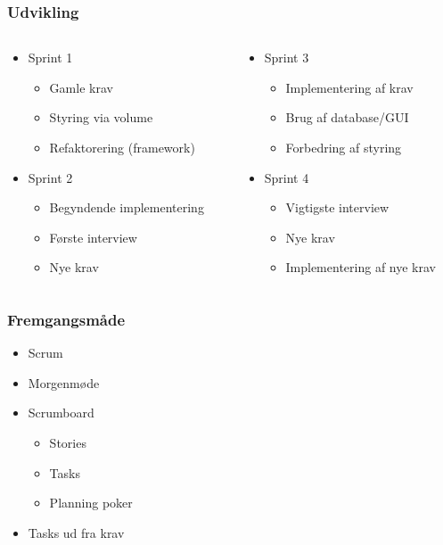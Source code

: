 \begin{frame}
\frametitle{Udvikling}

\begin{columns}

\begin{column}{.48\textwidth}
\begin{itemize}
\item Sprint 1
\begin{itemize}
\item Gamle krav
\item Styring via volume
\item Refaktorering (framework)
\end{itemize}
\item Sprint 2
\begin{itemize}
\item Begyndende implementering
\item Første interview
\item Nye krav
\end{itemize}
\end{itemize}
\end{column}

\begin{column}{.48\textwidth}
\begin{itemize}
\item Sprint 3
\begin{itemize}
\item Implementering af krav
\item Brug af database/GUI
\item Forbedring af styring
\end{itemize}
\item Sprint 4
\begin{itemize}
\item Vigtigste interview
\item Nye krav
\item Implementering af nye krav
\end{itemize}
\end{itemize}
\end{column}

\end{columns}

\end{frame}

\begin{frame}
\frametitle{Fremgangsmåde}

\begin{itemize}
\item Scrum
\item Morgenmøde
\item Scrumboard
\begin{itemize}
\item Stories
\item Tasks
\item Planning poker
\end{itemize}
\item Tasks ud fra krav
\end{itemize}

\end{frame}